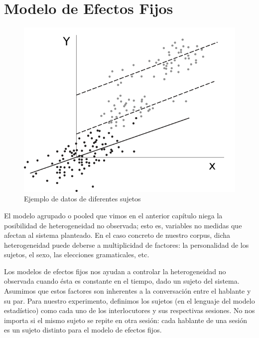 \section{Modelo de Efectos Fijos}

\begin{figure}[t]
\centering
\includegraphics[scale=1]{images/fixed_effects_example.pdf}
\caption{Ejemplo de datos de diferentes sujetos}
\label{fig:efectos_fijo}
\end{figure}



\newcommand{\slopeestim}[1] { $\estslope \sim #1$ }

El modelo agrupado o pooled que vimos en el anterior capítulo niega la posibilidad de heterogeneidad no observada; esto es, variables no medidas que afectan al sistema planteado. En el caso concreto de nuestro corpus, dicha heterogeneidad puede deberse a multiplicidad de factores: la personalidad de los sujetos, el sexo, las elecciones gramaticales, etc.


Los modelos de efectos fijos nos ayudan a controlar la heterogeneidad no observada cuando ésta es constante en el tiempo, dado un sujeto del sistema. Asumimos que estos factores son inherentes a la conversación entre el hablante y su par. Para nuestro experimento, definimos los sujetos (en el lenguaje del modelo estadístico) como cada uno de los interlocutores y sus respectivas sesiones. No nos importa si el mismo sujeto se repite en otra sesión: cada hablante de una sesión es un sujeto distinto para el modelo de efectos fijos. 

